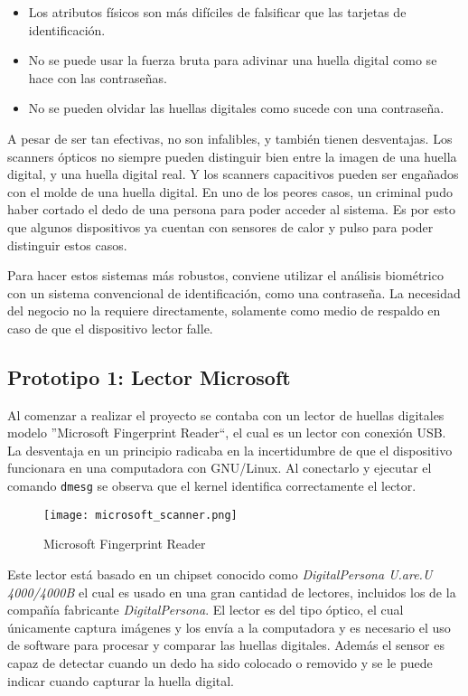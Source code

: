 \begin{itemize}
 \item Los atributos físicos son más difíciles de falsificar que las tarjetas de identificación.
 \item No se puede usar la fuerza bruta para adivinar una huella digital como se hace con las contraseñas.
 \item No se pueden olvidar las huellas digitales como sucede con una contraseña.
\end{itemize}

A pesar de ser tan efectivas, no son infalibles, y también tienen desventajas. Los scanners ópticos no siempre pueden distinguir bien entre la imagen de una huella digital, y una huella digital real. Y los scanners capacitivos pueden ser engañados con el molde de una huella digital. En uno de los peores casos, un criminal pudo haber cortado el dedo de una persona para poder acceder al sistema. Es por esto que algunos dispositivos ya cuentan con sensores de calor y pulso para poder distinguir estos casos.

Para hacer estos sistemas más robustos, conviene utilizar el análisis biométrico con un sistema convencional de identificación, como una contraseña. La necesidad del negocio no la requiere directamente, solamente como medio de respaldo en caso de que el dispositivo lector falle.

\subsection{Prototipo 1: Lector Microsoft}
\label{sec:lector_microsoft}

Al comenzar a realizar el proyecto se contaba con un lector de huellas digitales modelo ''Microsoft Fingerprint Reader``, el cual es un lector con conexión USB. La desventaja en un principio radicaba en la incertidumbre de que el dispositivo funcionara en una computadora con GNU/Linux. Al conectarlo y ejecutar el comando \texttt{dmesg} se observa que el kernel identifica correctamente el lector.

\begin{figure}[htb]
 \begin{center}
  \texttt{[image: microsoft\_scanner.png]}
 \end{center}
 \caption{Microsoft Fingerprint Reader}
 \label{fig:finger_print_2}
\end{figure}

Este lector está basado en un chipset conocido como \textit{DigitalPersona U.are.U 4000/4000B} el cual es usado en una gran cantidad de lectores, incluidos los de la compañía fabricante \textit{DigitalPersona}. El lector es del tipo óptico, el cual únicamente captura imágenes y los envía a la computadora y es necesario el uso de software para procesar y comparar las huellas digitales. Además el sensor es capaz de detectar cuando un dedo ha sido colocado o removido y se le puede indicar cuando capturar la huella digital.

